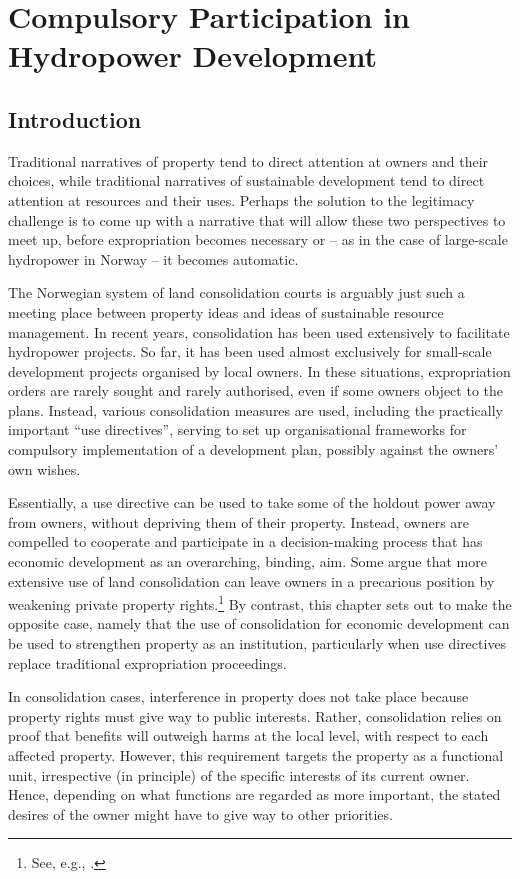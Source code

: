 \chapter{Compulsory Participation in Hydropower Development}\label{chap:6}

\section{Introduction}\label{sec:intro6}

Traditional narratives of property tend to direct attention at owners and their choices, while traditional narratives of sustainable development tend to direct attention at resources and their uses. Perhaps the solution to the legitimacy challenge is to come up with a narrative that will allow these two perspectives to meet up, before expropriation becomes necessary or -- as in the case of large-scale hydropower in Norway -- it becomes automatic.

The Norwegian system of land consolidation courts is arguably just such a meeting place between property ideas and ideas of sustainable resource management. In recent years, consolidation has been used extensively to facilitate hydropower projects. So far, it has been used almost exclusively for small-scale development projects organised by local owners. In these situations, expropriation orders are rarely sought and rarely authorised, even if some owners object to the plans. Instead, various consolidation measures are used, including the practically important ``use directives'', serving to set up organisational frameworks for compulsory implementation of a development plan, possibly against the owners' own wishes.

Essentially, a use directive can be used to take some of the holdout power away from owners, without depriving them of their property. Instead, owners are compelled to cooperate and participate in a decision-making process that has economic development as an overarching, binding, aim. Some argue that more extensive use of land consolidation can leave owners in a precarious position by weakening private property rights.\footnote{See, e.g., \cite{stenseth07}.} By contrast, this chapter sets out to make the opposite case, namely that the use of consolidation for economic development can be used to strengthen property as an institution, particularly when use directives replace traditional expropriation proceedings.

In consolidation cases, interference in property does not take place because property rights must give way to public interests. Rather, consolidation relies on proof that benefits will outweigh harms at the local level, with respect to each affected property. However, this requirement targets the property as a functional unit, irrespective (in principle) of the specific interests of its current owner. Hence, depending on what functions are regarded as more important, the stated desires of the owner might have to give way to other priorities.


